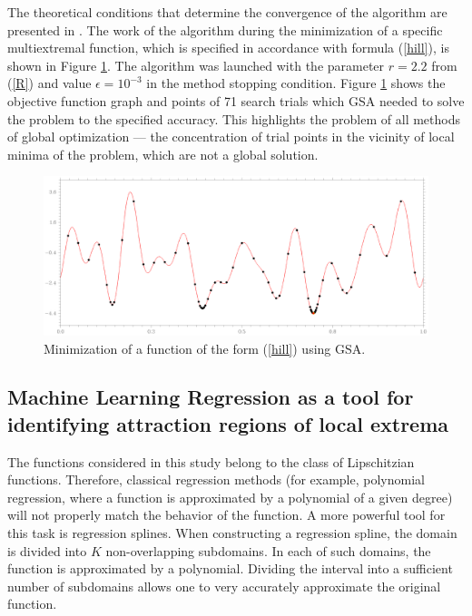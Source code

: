 \documentclass[entropy,article,submit,moreauthors,pdftex]{Definitions/mdpi}
\begin{document}
The theoretical conditions that determine the convergence of the algorithm are presented in \cite{Strongin2000}. 
The work of the algorithm during the minimization of a specific multiextremal function, which is specified in accordance with formula  (\ref{hill}), is shown in Figure \ref{fig1}. The algorithm was launched with the parameter $r=2.2$ from (\ref{R}) and value $\epsilon = 10^{-3}$ in the method stopping condition.
Figure \ref{fig1} shows the objective function graph and points of 71 search trials which GSA needed to solve the problem to the specified accuracy. This highlights the problem of all methods of global optimization --- the concentration of trial points in the vicinity of local minima of the problem, which are not a global solution.

\begin{figure}[H]
\includegraphics[width=1.0\linewidth]{HillAGP90.png}
\caption{Minimization of a function of the form  (\ref{hill}) using GSA.}
\label{fig1}
\end{figure}   


\subsection{Machine Learning Regression as a tool for identifying attraction regions of local extrema}\label{TreeGSA}

The functions considered in this study belong to the class of Lipschitzian functions. Therefore, classical regression methods (for example, polynomial regression, where a function is approximated by a polynomial of a given degree) will not properly match the behavior of the function.
A more powerful tool for this task is regression splines. When constructing a regression spline, the domain is divided into $K$ non-overlapping subdomains. In each of such domains, the function is approximated by a polynomial. Dividing the interval into a sufficient number of subdomains allows one to very accurately approximate the original function.
\end{document}

